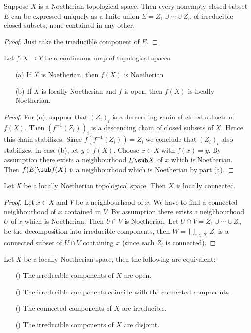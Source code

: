 \begin{proposition}\label{topo Noe irreducible decomp}
Suppose $X$ is a Noetherian topological space. Then every nonempty closed subset $E$ can be expressed uniquely as a finite union $E=Z_1\cup\cdots\cup Z_n$ of irreducible closed subsets, none contained in any other.
\end{proposition}
\begin{proof}
Just take the irreducible component of $E$.
\end{proof}
\begin{proposition}\label{topo space Noe under continuous map}
Let $f:X\to Y$ be a continuous map of topological spaces.
\begin{itemize}
\item[(a)] If $X$ is Noetherian, then $f(X)$ is Noetherian
\item[(b)] If $X$ is locally Noetherian and $f$ is open, then $f(X)$ is locally Noetherian.
\end{itemize}
\end{proposition}
\begin{proof}
For (a), suppose that $(Z_i)_i$ is a descending chain of closed subsets of $f(X)$. Then $(f^{-1}(Z_i))_i$ is a descending chain of closed subsets of $X$. Hence this chain stabilizes. Since $f(f^{-1}(Z_i))=Z_i$ we conclude that $(Z_i)_i$ also stabilizes. In case (b), let $y\in f(X)$. Choose $x\in X$ with $f(x)=y$. By assumption there exists a neighbourhood $E\sub X$ of $x$ which is Noetherian. Then $f(E)\sub f(X)$ is a neighbourhood which is Noetherian by part (a).
\end{proof}
\begin{proposition}\label{topo space local Noe is local connected}
Let $X$ be a locally Noetherian topological space. Then $X$ is locally
connected.
\end{proposition}
\begin{proof}
Let $x\in X$ and $V$ be a neighbourhood of $x$. We have to find a connected neighbourhood of $x$ contained in $V$. By assumption there exists a neighbourhood $U$ of $x$ which is Noetherian. Then $U\cap V$ is Noetherian. Let $U\cap V=Z_1\cup\cdots\cup Z_n$ be the decomposition into irreducible components, then $W=\bigcup_{x\in Z_i}Z_i$ is a connected subset of $U\cap V$ containing $x$ (since each $Z_i$ is connected).
\end{proof}
\begin{proposition}\label{topo space locally Noe irre component open iff}
Let $X$ be a locally Noetherian space, then the following are equivalent:
\begin{itemize}
\item[(\rmnum{1})] The irreducible components of $X$ are open.
\item[(\rmnum{2})] The irreducible components coincide with the connected components.
\item[(\rmnum{3})] The connected components of $X$ are irreducible.
\item[(\rmnum{4})] The irreducible components of $X$ are disjoint.
\end{itemize}
\end{proposition}

